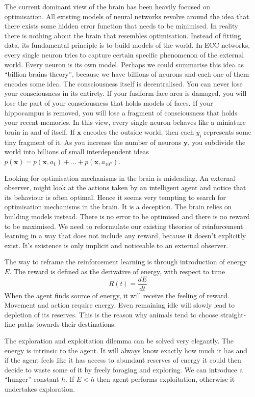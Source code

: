 \documentclass[12pt]{article}
\begin{document}
The current dominant view of the brain has been heavily focused on optimisation.
All existing models of neural networks revolve around the idea that there exists some hidden error function that needs to be minimised. In reality there is nothing about the brain that resembles optimisation. Instead of fitting data, its fundamental principle is to build models of the world. In ECC networks, every single neuron tries to capture certain specific phenomenon of the external world. Every neuron is its own model. Perhaps we could summarise this idea as ``billion brains theory'', because we have billions of neurons and each one of them encodes some idea. The consciousness itself is decentralised. You can never lose your consciousness in its entirety. If your fusiform face area is damaged, you will lose the part of your consciousness that holds models of faces. If your hippocampus is removed, you will lose a fragment of consciousness that holds your recent memories.  In this view, every single neuron behaves like a miniature brain in and of itself. If $\boldsymbol{x}$ encodes the outside world, then each $y_i$ represents some tiny fragment of it. As you increase the number of neurons $\boldsymbol{y}$, you subdivide the world into billions of small interdependent ideas $p(\boldsymbol{x})=p(\boldsymbol{x},a_1)+...+p(\boldsymbol{x},a_{10^9})$.

Looking for optimisation mechanisms in the brain is misleading. An external observer, might look at the actions taken by an intelligent agent and notice that its behaviour is often optimal. Hence it seems very tempting to search for optimisation mechanisms in the brain. It is a deception. The brain relies on building models instead. There is no error to be optimised and there is no reward to be maximised. We need to reformulate our existing theories of reinforcement learning in a way that does not include any reward, because it doesn't explicitly exist. It's existence is only implicit and noticeable to an external observer.

The way to reframe the reinforcement learning is through introduction of energy $E$. The reward is defined as the derivative of energy, with respect to time
\[
R(t) = \frac{dE}{dt}
\]
When the agent finds source of energy, it will receive the feeling of reward.
Movement and action require energy. Even remaining idle will slowly lead to depletion of its reserves. This is the reason why animals tend to choose straight-line paths towards their destinations. 

The exploration and exploitation dilemma can be solved very elegantly. The energy is intrinsic to the agent. It will always know exactly how much it has and if the agent feels like it has access to abundant reserves of energy it could then decide to waste some of it by freely foraging and exploring. We can introduce a ``hunger'' constant  $h$. If $E<h$ then agent performs exploitation, otherwise it undertakes exploration.
\end{document}

